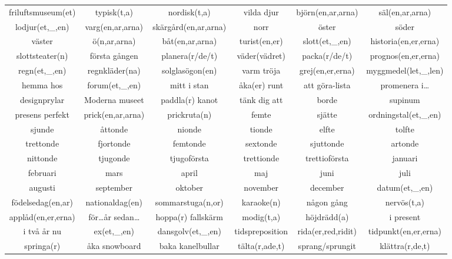 \begin{center}
    \begin{adjustwidth}{-2.4cm}{}
        \begin{tabular}{|c c c c c c|}
            \hline
            friluftsmuseum(et) & typisk(t,a) & nordisk(t,a) & vilda djur & björn(en,ar,arna) & säl(en,ar,arna) \\
            lodjur(et,\_,en) & varg(en,ar,arna) & skärgård(en,ar,arna) & norr & öster & söder \\
            väster & ö(n,ar,arna) & båt(en,ar,arna) & turist(en,er) & slott(et,\_,en) & historia(en,er,erna) \\
            slottsteater(n) & första gången & planera(r/de/t) & väder(vädret) & packa(r/de/t) & prognos(en,er,erna) \\
            regn(et,\_,en) & regnkläder(na) & solglasögon(en) & varm tröja & grej(en,er,erna) & myggmedel(let,\_,len) \\
            hemma hos & forum(et,\_,en) & mitt i stan & åka(er) runt & att göra-lista & promenera i\ldots \\
            designprylar & Moderna museet & paddla(r) kanot & tänk dig att & borde & supinum \\
            presens perfekt & prick(en,ar,arna) & prickruta(n) & femte & sjätte & ordningstal(et,\_,en) \\
            sjunde & åttonde & nionde & tionde & elfte & tolfte \\
            trettonde & fjortonde & femtonde & sextonde & sjuttonde  & artonde \\
            nittonde & tjugonde & tjugoförsta & trettionde & trettioförsta & januari \\
            februari & mars & april & maj & juni & juli \\
            augusti & september & oktober & november & december & datum(et,\_,en) \\
            födelsedag(en,ar) & nationaldag(en) & sommarstuga(n,or) & karaoke(n) & någon gång & nervös(t,a) \\
            applåd(en,er,erna) & för\ldots år sedan\ldots & hoppa(r) fallskärm & modig(t,a) & höjdrädd(a) & i present \\
            i två år nu & ex(et,\_,en) & dansgolv(et,\_,en) & tidspreposition & rida(er,red,ridit) & tidpunkt(en,er,erna) \\
            springa(r) & åka snowboard & baka kanelbullar & tälta(r,ade,t) & sprang/sprungit & klättra(r,de,t) \\

\end{tabular}
\end{adjustwidth}
\end{center}
